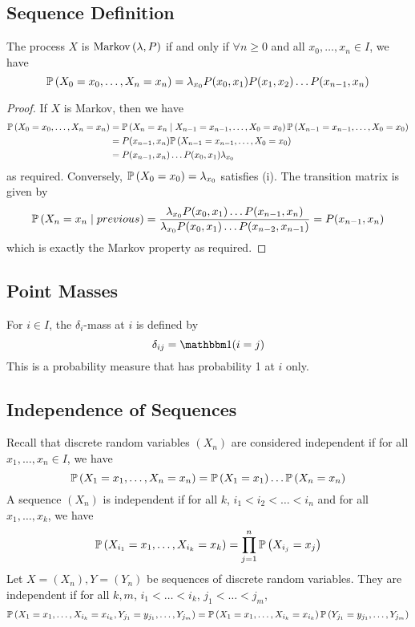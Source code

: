 \subsection{Sequence Definition}
\begin{theorem}
The process \( X \) is \( \operatorname{Markov}\left({\lambda, P}\right) \) if and only if \( \forall n \geq 0 \) and all \( x_0, \dots, x_n \in I \), we have
\[ \mathbb{P}\left({X_0 = x_0, \dots, X_n = x_n}\right) = \lambda_{x_0} P(x_0, x_1) P(x_1, x_2) \dots P(x_{n-1}, x_n) \]
\end{theorem}
\begin{proof}
If \( X \) is Markov, then we have
\begin{align*}
\mathbb{P}\left({X_0 = x_0, \dots, X_n = x_n}\right) &= \mathbb{P}\left({X_n = x_n \mid X_{n-1} = x_{n-1}, \dots, X_0 = x_0}\right) \mathbb{P}\left({X_{n-1} = x_{n-1}, \dots, X_0 = x_0}\right) \\
&= P(x_{n-1}, x_n) \mathbb{P}\left({X_{n-1} = x_{n-1}, \dots, X_0 = x_0}\right) \\
&= P(x_{n-1}, x_n) \dots P(x_0, x_1) \lambda_{x_0}
\end{align*}
as required.
Conversely, \( \mathbb{P}\left({X_0 = x_0}\right) = \lambda_{x_0} \) satisfies (i).
The transition matrix is given by
\[ \mathbb{P}\left({X_n = x_n \mid previous}\right) = \frac{\lambda_{x_0} P(x_0, x_1) \dots P(x_{n-1}, x_n)}{\lambda_{x_0} P(x_0, x_1) \dots P(x_{n-2}, x_{n-1})} = P(x_{n-1}, x_n) \]
which is exactly the Markov property as required.
\end{proof}

\subsection{Point Masses}
\begin{definition}
For \( i \in I \), the \( \delta_i \)-mass at \( i \) is defined by
\[ \delta_{ij} = \mathbbm 1 (i = j) \]
This is a probability measure that has probability 1 at \( i \) only.
\end{definition}

\subsection{Independence of Sequences}
Recall that discrete random variables \( (X_n) \) are considered independent if for all \( x_1, \dots, x_n \in I \), we have
\[ \mathbb{P}\left({X_1 = x_1, \dots, X_n = x_n}\right) = \mathbb{P}\left({X_1 = x_1}\right)\dots\mathbb{P}\left({X_n = x_n}\right) \]
A sequence \( (X_n) \) is independent if for all \( k \), \( i_1 < i_2 < \dots < i_n \) and for all \( x_1, \dots, x_k \), we have
\[ \mathbb{P}\left({X_{i_1} = x_1, \dots, X_{i_k} = x_k}\right) = \prod_{j=1}^n \mathbb{P}\left({X_{i_j} = x_j}\right) \]
Let \( X = (X_n), Y = (Y_n) \) be sequences of discrete random variables.
They are independent if for all \(k,m\), \( i_1 < \dots < i_k \), \( j_1 < \dots < j_m \),
\[ \mathbb{P}\left({X_1 = x_1, \dots, X_{i_k} = x_{i_k}, Y_{j_1} = y_{j_1}, \dots, Y_{j_m}}\right) = \mathbb{P}\left({X_1 = x_1, \dots, X_{i_k} = x_{i_k}}\right) \mathbb{P}\left({Y_{j_1} = y_{j_1}, \dots, Y_{j_m}}\right) \]


